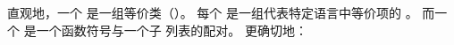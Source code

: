 直观地，一个 \egraph 是一组等价类（\textit{\eclasses}）。
每个 \eclass 是一组代表特定语言中等价项的 \textit{\enodes} 。
  而一个 \enode 是一个函数符号与一个子 \eclasses 列表的配对。
更确切地：







